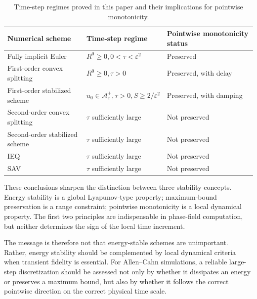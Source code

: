 \documentclass[final, 3p, times]{elsarticle}%
\newcommand{\eps}{\varepsilon}
\newcommand{\Aepsp}{\mathcal A_\varepsilon^+}
\newcommand{\Aeps}{\Aepsp}
\begin{document}
\begin{table}[!htbp]
\centering
\small
\caption{Time-step regimes proved in this paper and their implications for pointwise monotonicity.}
\label{tab:concluding-classification}
\renewcommand{\arraystretch}{1.25}
\begin{tabular}{@{}p{}p{}p{}@{}}
\hline
Numerical scheme & Time-step regime & Pointwise monotonicity status \\
\hline
Fully implicit Euler &
\(R^0\ge0, 0<\tau<\eps^2\) &
Preserved \\
First-order convex splitting &
\(R^0\ge0, \tau>0\) &
Preserved, with delay \\
First-order stabilized scheme &
\(u_0\in\Aeps, \tau>0, S\ge2/\eps^2\) &
Preserved, with damping \\
Second-order convex splitting &
\(\tau\) sufficiently large &
Not preserved \\
Second-order stabilized scheme &
\(\tau\) sufficiently large &
Not preserved \\
IEQ &
\(\tau\) sufficiently large &
Not preserved \\
SAV &
\(\tau\) sufficiently large &
Not preserved \\
\hline
\end{tabular}
\renewcommand{\arraystretch}{1.0}
\end{table}

These conclusions sharpen the distinction between three stability concepts. Energy stability is a global Lyapunov-type property; maximum-bound preservation is a range constraint; pointwise monotonicity is a local dynamical property. The first two principles are indispensable in phase-field computation, but neither determines the sign of the local time increment.

The message is therefore not that energy-stable schemes are unimportant. Rather, energy stability should be complemented by local dynamical criteria when transient fidelity is essential. For Allen--Cahn simulations, a reliable large-step discretization should be assessed not only by whether it dissipates an energy or preserves a maximum bound, but also by whether it follows the correct pointwise direction on the correct physical time scale.

%
\appendix
\renewcommand{\thetheorem}{\Alph{section}.\arabic{theorem}}
\end{document}
